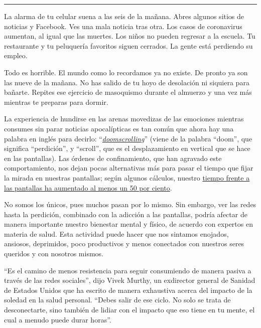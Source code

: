 \begin{center}\rule{0.5\linewidth}{\linethickness}\end{center}

La alarma de tu celular suena a las seis de la mañana. Abres algunos
sitios de noticias y Facebook. Ves una mala noticia tras otra. Los casos
de coronavirus aumentan, al igual que las muertes. Los niños no pueden
regresar a la escuela. Tu restaurante y tu peluquería favoritos siguen
cerrados. La gente está perdiendo su empleo.

Todo es horrible. El mundo como lo recordamos ya no existe. De pronto ya
son las nueve de la mañana. No has salido de tu hoyo de desolación ni
siquiera para bañarte. Repites ese ejercicio de masoquismo durante el
almuerzo y una vez más mientras te preparas para dormir.

La experiencia de hundirse en las arenas movedizas de las emociones
mientras consumes sin parar noticias apocalípticas es tan común que
ahora hay una palabra en inglés para decirlo:
``\href{https://www.merriam-webster.com/words-at-play/doomsurfing-doomscrolling-words-were-watching}{\emph{doomscrolling}}''
(viene de la palabra ``doom'', que significa ``perdición'', y
``scroll'', que es el desplazamiento en vertical que se hace en las
pantallas). Las órdenes de confinamiento, que han agravado este
comportamiento, nos dejan pocas alternativas más para pasar el tiempo
que fijar la mirada en nuestras pantallas; según algunos cálculos,
nuestro
\href{https://www.axios.com/kids-screen-time-coronavirus-562073f6-0638-47f2-8ea3-4f8781d6b31b.html}{tiempo
frente a las pantallas ha aumentado al menos un 50 por ciento}.

No somos los únicos, pues muchos pasan por lo mismo. Sin embargo, ver
las redes hasta la perdición, combinado con la adicción a las pantallas,
podría afectar de manera importante nuestro bienestar mental y físico,
de acuerdo con expertos en materia de salud. Esta actividad puede hacer
que nos sintamos enojados, ansiosos, deprimidos, poco productivos y
menos conectados con nuestros seres queridos y con nosotros mismos.

``Es el camino de menos resistencia para seguir consumiendo de manera
pasiva a través de las redes sociales'', dijo Vivek Murthy, un
exdirector general de Sanidad de Estados Unidos que ha escrito de manera
exhaustiva acerca del impacto de la soledad en la salud personal.
``Debes salir de ese ciclo. No solo se trata de desconectarte, sino
también de lidiar con el impacto que eso tiene en tu mente, el cual a
menudo puede durar horas''.

